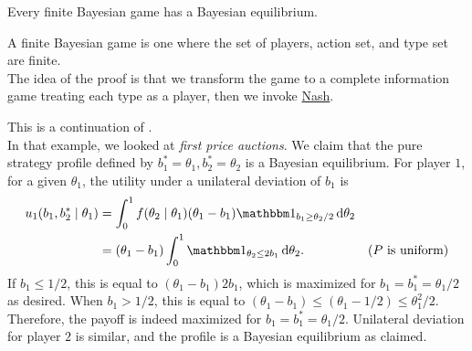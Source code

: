 	\begin{ftheo}
		Every finite Bayesian game has a Bayesian equilibrium.
	\end{ftheo}
	A finite Bayesian game is one where the set of players, action set, and type set are finite.\\
	The idea of the proof is that we transform the game to a complete information game treating each type as a player, then we invoke \hyperref[theo: msne exists]{Nash}.

	\begin{fex}
		This is a continuation of .\\
		In that example, we looked at \emph{first price auctions}. We claim that the pure strategy profile defined by $b_1^* = \theta_1, b_2^* = \theta_2$ is a Bayesian equilibrium.
		For player $1$, for a given $\theta_1$, the utility under a unilateral deviation of $b_1$ is
		\begin{align*}
			u_1(b_1,b_2^* \mid \theta_1) &= \int_0^1 f(\theta_2 \mid \theta_1) (\theta_1 - b_1) \indic_{b_1 \ge \theta_2/2} \dif \theta_2 \\
				&= (\theta_1 - b_1) \int_0^1 \indic_{\theta_2 \le 2b_1} \dif \theta_2. & \text{($P$ is uniform)}
		\end{align*}
		If $b_1 \le 1/2$, this is equal to $(\theta_1 - b_1)2b_1$, which is maximized for $b_1 = b_1^* = \theta_1/2$ as desired. When $b_1 > 1/2$, this is equal to $(\theta_1 - b_1) \le (\theta_1 - 1/2) \le \theta_1^2/2$.\\
		Therefore, the payoff is indeed maximized for $b_1 = b_1^* = \theta_1/2$. Unilateral deviation for player $2$ is similar, and the profile is a Bayesian equilibrium as claimed.
	\end{fex}

